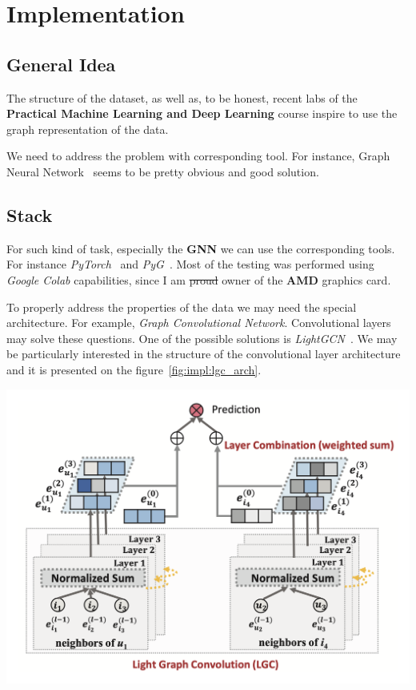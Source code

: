 \section{Implementation}

\subsection{General Idea}

The structure of the dataset, as well as, to be honest, recent labs of the
\textbf{Practical Machine Learning and Deep Learning} course inspire to use the
graph representation of the data.

We need to address the problem with corresponding tool. For instance, Graph
Neural Network~\cite{zhouGraphNeuralNetworks2020} seems to be pretty obvious
and good solution.

\subsection{Stack}

For such kind of task, especially the \textbf{GNN} we can use the corresponding
tools. For instance \textit{PyTorch}~\cite{PyTorch} and
\textit{PyG}~\cite{PyG}. Most of the testing was performed using \textit{Google
    Colab} capabilities, since I am \sout{proud} owner of the \textbf{AMD} graphics
card.

To properly address the properties of the data we may need the special
architecture. For example, \textit{Graph Convolutional Network}. Convolutional
layers may solve these questions. One of the possible solutions is
\textit{LightGCN}~\cite{heLightGCNSimplifyingPowering2020}. We may be
particularly interested in the structure of the convolutional layer
architecture and it is presented on the figure~\ref{fig:impl:lgc_arch}.

\begin{minipage}{\linewidth}
    \centering%
    \includegraphics[scale=0.23]{assets/lgc_architecture.png}%
    \label{fig:impl:lgc_arch}%
\end{minipage}

